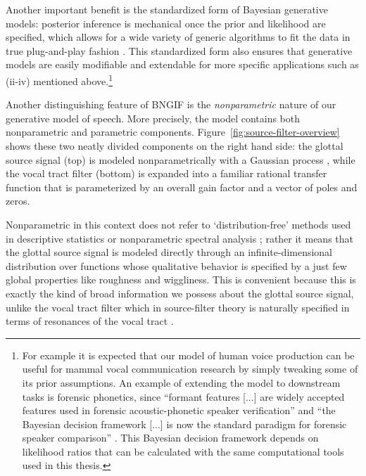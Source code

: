 \begin{chaptersections}
Another important benefit is the standardized form of Bayesian generative models:
posterior inference is mechanical once the prior and likelihood are specified, which allows for a wide variety of generic algorithms to fit the data in true plug-and-play fashion \citep{Murphy2022}.
This standardized form also ensures that generative models are easily modifiable and extendable for more specific applications such as (ii-iv) mentioned above.\footnote{%
For example it is expected that our model of human voice production can be useful for mammal vocal communication research \citep{Taylor2010} by simply tweaking some of its prior assumptions.
An example of extending the model to downstream tasks is forensic phonetics, since ``formant features [...] are widely accepted features used in forensic acoustic-phonetic speaker verification'' \citep[][p.~1]{Becker2008} and ``the Bayesian decision framework [...] is now the standard paradigm for forensic speaker comparison'' \citep[][p.~1]{Bonastre2015}.
This Bayesian decision framework depends on likelihood ratios \citep{Harrison2013} that can be calculated with the same computational tools used in this thesis.
}

Another distinguishing feature of BNGIF is the \emph{nonparametric} nature of our generative model of speech.
More precisely, the model contains both nonparametric and parametric components.
Figure~\ref{fig:source-filter-overview} shows these two neatly divided components on the right hand side:
the glottal source signal (top) is modeled nonparametrically with a Gaussian process \citep[GP;][]{Rasmussen2006}, while the vocal tract filter (bottom) is expanded into a familiar rational transfer function that is parameterized by an overall gain factor and a vector of poles and zeros.

Nonparametric in this context does not refer to `distribution-free' methods used in descriptive statistics or nonparametric spectral analysis \citep{Stoica2005};
rather it means that the glottal source signal is modeled directly through an infinite-dimensional distribution over functions whose qualitative behavior is specified by a just few global properties like roughness and wiggliness.
This is convenient because this is exactly the kind of broad information we possess about the glottal source signal, unlike the vocal tract filter which in source-filter theory is naturally specified in terms of resonances of the vocal tract \citep{Stevens2000}.



\end{chaptersections}
